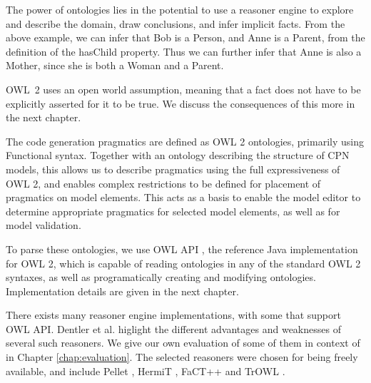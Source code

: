 The power of ontologies lies in the potential to use a reasoner engine to
explore and describe the domain, draw conclusions, and infer implicit facts.
From the above example, we can infer that Bob is a Person, and Anne is a Parent,
from the definition of the hasChild property. Thus we can further infer that
Anne is also a Mother, since she is both a Woman and a Parent.

OWL~2 uses an open world assumption, meaning that a fact does not have to be
explicitly asserted for it to be true. We discuss the consequences of this more
in the next chapter.

The code generation pragmatics are defined as OWL 2 ontologies, primarily using
Functional syntax. Together with an ontology describing the structure of CPN
models, this allows us to describe pragmatics using the full expressiveness of
OWL 2, and enables complex restrictions to be defined for placement of
pragmatics on model elements. This acts as a basis to enable the \thename{}
model editor to determine appropriate pragmatics for selected model elements, as
well as for model validation. 

To parse these ontologies, we use OWL API \cite{owlapi}, the reference Java
implementation for OWL 2, which is capable of reading ontologies in any of the
standard OWL 2 syntaxes, as well as programatically creating and modifying ontologies.
Implementation details are given in the next chapter.

There exists many reasoner engine implementations, with some that support OWL
API. Dentler et al. \cite{dentler2011comparison} higlight the different
advantages and weaknesses of several such reasoners.
We give our own evaluation of some of them in context of \thename{} in Chapter
\ref{chap:evaluation}. The selected reasoners were chosen for being freely
available, and include Pellet \cite{sirin2007pellet}, HermiT
\cite{shearer2008hermit}, FaCT++ \cite{tsarkov2006fact++} and TrOWL
\cite{TPR2010}.
